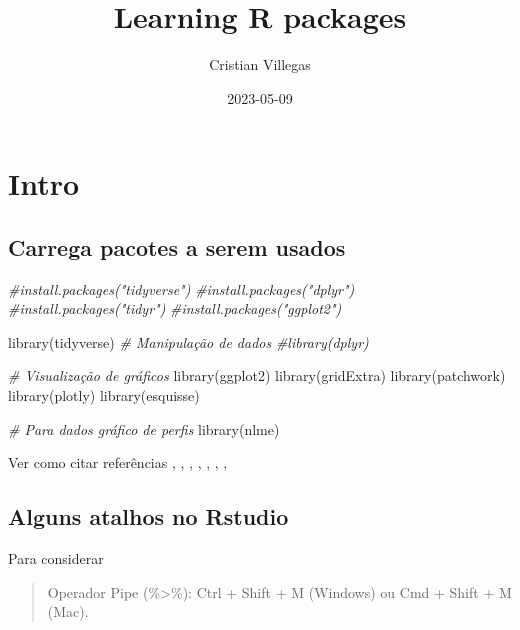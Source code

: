 \documentclass[
]{book}
\title{Learning R packages}
\author{Cristian Villegas}
\date{2023-05-09}
\newenvironment{Shaded}{\begin{snugshade}}{\end{snugshade}}
\newcommand{\CommentTok}[1]{\textcolor[rgb]{0.56,0.35,0.01}{\textit{#1}}}
\newcommand{\FunctionTok}[1]{\textcolor[rgb]{0.00,0.00,0.00}{#1}}
\newcommand{\NormalTok}[1]{#1}
\begin{document}
\maketitle

{
\setcounter{tocdepth}{1}
\tableofcontents
}
\hypertarget{intro}{%
\chapter{Intro}\label{intro}}

\hypertarget{carrega-pacotes-a-serem-usados}{%
\section{Carrega pacotes a serem usados}\label{carrega-pacotes-a-serem-usados}}

\begin{Shaded}
\begin{Highlighting}[]
\CommentTok{\#install.packages("tidyverse") }
\CommentTok{\#install.packages("dplyr")     }
\CommentTok{\#install.packages("tidyr")     }
\CommentTok{\#install.packages("ggplot2")   }

\FunctionTok{library}\NormalTok{(tidyverse)}
\CommentTok{\# Manipulação de dados}
\CommentTok{\#library(dplyr)}

\CommentTok{\# Visualização de gráficos}
\FunctionTok{library}\NormalTok{(ggplot2)}
\FunctionTok{library}\NormalTok{(gridExtra)}
\FunctionTok{library}\NormalTok{(patchwork)}
\FunctionTok{library}\NormalTok{(plotly)}
\FunctionTok{library}\NormalTok{(esquisse)}

\CommentTok{\# Para dados gráfico de perfis}
\FunctionTok{library}\NormalTok{(nlme)}
\end{Highlighting}
\end{Shaded}

Ver como citar referências \citet{tidyverse2019}, \citet{R-tidyverse}, \citet{R-tidyr}, \citet{R-ggplot2}, \citet{R-purrr}, \citet{R-dplyr}, \citet{R-knitr}, \citet{R-bookdown}

\hypertarget{alguns-atalhos-no-rstudio}{%
\section{Alguns atalhos no Rstudio}\label{alguns-atalhos-no-rstudio}}

Para considerar

\begin{quote}
Operador Pipe (\%\textgreater\%): Ctrl + Shift + M (Windows) ou Cmd + Shift + M (Mac).
\end{quote}
\end{document}
